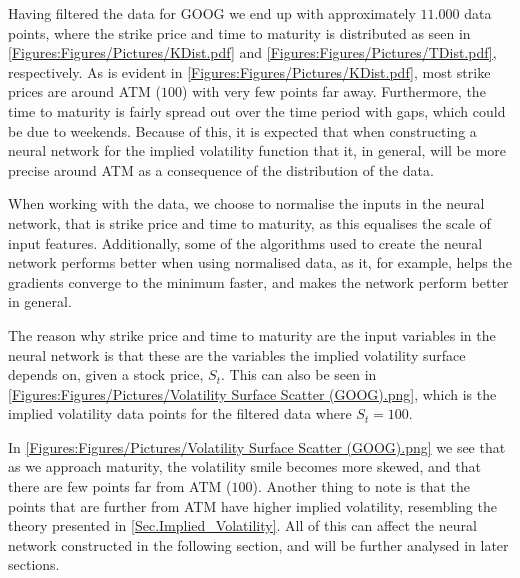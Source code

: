 Having filtered the data for GOOG we end up with approximately $11.000$ data points, where the strike price and time to maturity is distributed as seen in \autoref{Figures:Figures/Pictures/KDist.pdf} and \autoref{Figures:Figures/Pictures/TDist.pdf}, respectively. As is evident in \autoref{Figures:Figures/Pictures/KDist.pdf}, most strike prices are around ATM ($100$) with very few points far away. Furthermore, the time to maturity is fairly spread out over the time period with gaps, which could be due to weekends. Because of this, it is expected that when constructing a neural network for the implied volatility function that it, in general, will be more precise around ATM as a consequence of the distribution of the data. 


When working with the data, we choose to normalise the inputs in the neural network, that is strike price and time to maturity, as this equalises the scale of input features. Additionally, some of the algorithms used to create the neural network performs better when using normalised data, as it, for example, helps the gradients converge to the minimum faster, and makes the network perform better in general.

The reason why strike price and time to maturity are the input variables in the neural network is that these are the variables the implied volatility surface depends on, given a stock price, $S_t$. This can also be seen in \autoref{Figures:Figures/Pictures/Volatility Surface Scatter (GOOG).png}, which is the implied volatility data points for the filtered data where $S_t = 100$. 


In \autoref{Figures:Figures/Pictures/Volatility Surface Scatter (GOOG).png} we see that as we approach maturity, the volatility smile becomes more skewed, and that there are few points far from ATM ($100$). Another thing to note is that the points that are further from ATM have higher implied volatility, resembling the theory presented in \autoref{Sec.Implied_Volatility}. All of this can affect the neural network constructed in the following section, and will be further analysed in later sections. 



